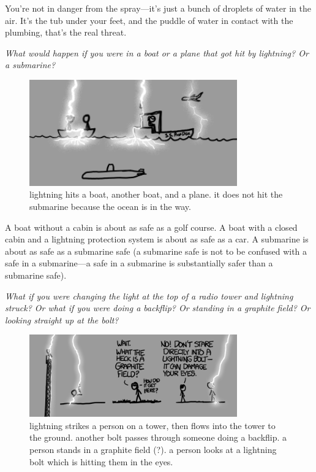 {You’re not in danger from the spray—it’s just a bunch of droplets of water in the air. It’s the tub under your feet, and the puddle of water in contact with the plumbing, that’s the real threat.}

{ \emph{What would happen if you were in a boat or a plane that got hit by lightning? Or a submarine?} }

\begin{figure}[!htbp]
\centering
\includegraphics[scale=0.5, max width=0.8\textwidth]{imgs/a/16/lightning_boat.png}
\caption{lightning hits a boat, another boat, and a plane. it does not hit the submarine because the ocean is in the way.}
\end{figure}

{A boat without a cabin is about as safe as a golf course. A boat with a closed cabin and a lightning protection system is about as safe as a car. A submarine is about as safe as a submarine safe (a submarine safe is not to be confused with a safe in a submarine—a safe in a submarine is substantially safer than a submarine safe).}

{ \emph{What if you were changing the light at the top of a radio tower and lightning struck? Or what if you were doing a backflip? Or standing in a graphite field? Or looking straight up at the bolt?} }

\begin{figure}[!htbp]
\centering
\includegraphics[scale=0.5, max width=0.8\textwidth]{imgs/a/16/lightning_graphite.png}
\caption{lightning strikes a person on a tower, then flows into the tower to the ground. another bolt passes through someone doing a backflip. a person stands in a graphite field (?). a person looks at a lightning bolt which is hitting them in the eyes.}
\end{figure}

